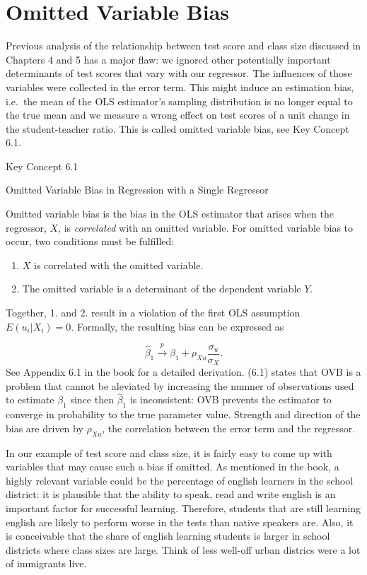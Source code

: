 \documentclass[]{book}
\providecommand{\tightlist}{%
  \setlength{\itemsep}{0pt}\setlength{\parskip}{0pt}}
\theoremstyle{definition}
\theoremstyle{definition}
\theoremstyle{definition}
\theoremstyle{remark}
\begin{document}
\section{Omitted Variable Bias}\label{omitted-variable-bias}

Previous analysis of the relationship between test score and class size
discussed in Chapters 4 and 5 has a major flaw: we ignored other
potentially important determinants of test scores that vary with our
regressor. The influences of those variables were collected in the error
term. This might induce an estimation bias, i.e.~the mean of the OLS
estimator's sampling distribution is no longer equal to the true mean
and we measure a wrong effect on test scores of a unit change in the
student-teacher ratio. This is called omitted variable bias, see Key
Concept 6.1.

Key Concept 6.1

Omitted Variable Bias in Regression with a Single Regressor

Omitted variable bias is the bias in the OLS estimator that arises when
the regressor, \(X\), is \emph{correlated} with an omitted variable. For
omitted variable bias to occur, two conditions must be fulfilled:

\begin{enumerate}
\def\labelenumi{\arabic{enumi}.}
\tightlist
\item
  \(X\) is correlated with the omitted variable.
\item
  The omitted variable is a determinant of the dependent variable \(Y\).
\end{enumerate}

Together, 1. and 2. result in a violation of the first OLS assumption
\(E(u_i\vert X_i) = 0\). Formally, the resulting bias can be expressed
as

\[ \hat\beta_1 \xrightarrow[]{p} \beta_1 + \rho_{Xu} \frac{\sigma_u}{\sigma_X}. \tag{6.1} \]
See Appendix 6.1 in the book for a detailed derivation. (6.1) states
that OVB is a problem that cannot be aleviated by increasing the numner
of observations used to estimate \(\beta_1\) since then \(\hat\beta_1\)
is inconsistent: OVB prevents the estimator to converge in probability
to the true parameter value. Strength and direction of the bias are
driven by \(\rho_{Xu}\), the correlation between the error term and the
regressor.

In our example of test score and class size, it is fairly easy to come
up with variables that may cause such a bias if omitted. As mentioned in
the book, a highly relevant variable could be the percentage of english
learners in the school district: it is plausible that the ability to
speak, read and write english is an important factor for successful
learning. Therefore, students that are still learning english are likely
to perform worse in the tests than native speakers are. Also, it is
conceivable that the share of english learning students is larger in
school districts where class sizes are large. Think of less well-off
urban districs were a lot of immigrants live.
\end{document}
